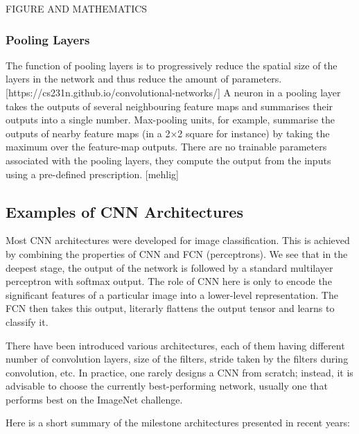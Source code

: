 FIGURE AND MATHEMATICS

\subsubsection{Pooling Layers}

The function of pooling layers is to progressively reduce the spatial size of the layers in the network and thus reduce the amount of parameters. [https://cs231n.github.io/convolutional-networks/] A neuron in a pooling layer takes the outputs of several neighbouring feature maps and summarises their outputs into a single number. Max-pooling units, for example, summarise the outputs of nearby feature maps (in a 2×2 square for instance) by taking the maximum over the feature-map outputs. There are no trainable parameters associated with the pooling layers, they compute the output from the inputs using a pre-defined prescription. [mehlig]

\subsection{Examples of CNN Architectures}

Most CNN architectures were developed for image classification. This is achieved by combining the properties of CNN and FCN (perceptrons). We see that in the deepest stage, the output of the network is followed by a standard multilayer perceptron with softmax output. The role of CNN here is only to encode the significant features of a particular image into a lower-level representation. The FCN then takes this output, literarly flattens the output tensor and learns to classify it.

There have been introduced various architectures, each of them having different number of convolution layers, size of the filters, stride taken by the filters during convolution, etc. In practice, one rarely designs a CNN from scratch; instead, it is advisable to choose the currently best-performing network, usually one that performs best on the ImageNet challenge.

Here is a short summary of the milestone architectures presented in recent years:

